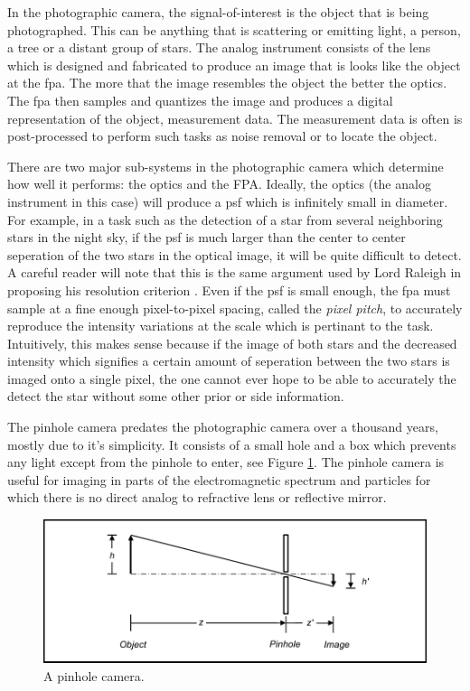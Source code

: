 In the photographic camera, the signal-of-interest is the object that is being photographed. This can be anything that is scattering or emitting light, a person, a tree or a distant group of stars. The analog instrument consists of the lens which is designed and fabricated to produce an image that is looks like the object at the \gls{fpa}. The more that the image resembles the object the better the optics. The \gls{fpa} then samples and quantizes the image and produces a digital representation of the object, measurement data. The measurement data is often is post-processed to perform such tasks as noise removal or to locate the object. 


There are two major sub-systems in the photographic camera which determine how well it performs: the optics and the FPA. Ideally, the optics (the analog instrument in this case) will produce a \gls{psf} which is infinitely small in diameter. For example, in a task such as the detection of a star from several neighboring stars in the night sky, if the \gls{psf} is much larger than the center to center seperation of the two stars in the optical image, it will be quite difficult to detect. A careful reader will note that this is the same argument used by Lord Raleigh in proposing his resolution criterion \cite{rayleigh1879investigations}. Even if the \gls{psf} is small enough, the \gls{fpa} must sample at a fine enough pixel-to-pixel spacing, called the \emph{pixel pitch}, to accurately reproduce the intensity variations at the scale which is pertinant to the task. Intuitively, this makes sense because if the image of both stars and the decreased intensity which signifies a certain amount of seperation between the two stars is imaged onto a single pixel, the one cannot ever hope to be able to accurately the detect the star without some other prior or side information. 

The pinhole camera predates the photographic camera over a thousand years, mostly due to it's simplicity. It consists of a small hole and a box which prevents any light except from the pinhole to enter, see Figure \ref{fig:pinholecamera}. The pinhole camera is useful for imaging in parts of the electromagnetic spectrum and particles for which there is no direct analog to refractive lens or reflective mirror. 

\begin{figure}
    \centering
    \includegraphics[scale=1]{pinholecamera}
    \caption{A pinhole camera.}
    \label{fig:pinholecamera}
\end{figure}

